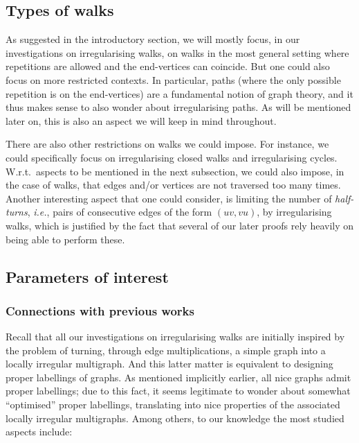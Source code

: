 \documentclass[a4paper,11pt,dvipsnames]{elsarticle}
\begin{document}
\subsection{Types of walks}\label{subsection:walk-types}

As suggested in the introductory section, we will mostly focus, in our investigations on irregularising walks, 
on walks in the most general setting where repetitions are allowed and the end-vertices can coincide.
But one could also focus on more restricted contexts.
In particular, paths (where the only possible repetition is on the end-vertices) are a fundamental notion of graph theory,
and it thus makes sense to also wonder about irregularising paths.
As will be mentioned later on, this is also an aspect we will keep in mind throughout.

There are also other restrictions on walks we could impose.
For instance, we could specifically focus on irregularising closed walks and irregularising cycles.
W.r.t.~aspects to be mentioned in the next subsection, we could also impose, in the case of walks,
that edges and/or vertices are not traversed too many times.
Another interesting aspect that one could consider, is limiting the number of \textit{half-turns}, 
\textit{i.e.}, pairs of consecutive edges of the form $(uv,vu)$, by irregularising walks, 
which is justified by the fact that several of our later proofs rely heavily on being able to perform these.

\subsection{Parameters of interest}

\subsubsection{Connections with previous works}

Recall that all our investigations on irregularising walks are initially inspired by the problem of turning, through edge multiplications, 
a simple graph into a locally irregular multigraph. And this latter matter is equivalent to designing proper labellings of graphs.
As mentioned implicitly earlier, all nice graphs admit proper labellings;
due to this fact, it seems legitimate to wonder about somewhat ``optimised'' proper labellings,
translating into nice properties of the associated locally irregular multigraphs.
Among others, to our knowledge the most studied aspects include:
\end{document}
